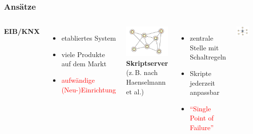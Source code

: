 \documentclass{beamer}
\newcommand{\customitemsep}{7pt}
\begin{document}
\begin{frame}
	\frametitle{Ansätze}
    \begin{columns}[c]
        \column[c]{10cm}
            \textbf{EIB/KNX}
            \begin{itemize} \setlength{\itemsep}{\customitemsep}
                \item etabliertes System
                \item viele Produkte auf dem Markt
                    \vspace*{0.5cm}
                \item \textcolor{red}{aufwändige (Neu-)Einrichtung}
            \end{itemize}
            \includegraphics[width=.9\linewidth]{img/decentralize-network.pdf}
            \pause
        \column{10cm}
            \textbf{Skriptserver} \\
            {\fontsize{15pt}{18pt} \selectfont (z.\,B. nach Haenselmann et al.)}
            \begin{itemize} \setlength{\itemsep}{\customitemsep}
                \item zentrale Stelle mit Schaltregeln
                \item Skripte jederzeit anpassbar
                    \vspace*{0.5cm}
                \item \textcolor{red}{\enquote{Single Point of Failure}}
            \end{itemize}
            \includegraphics[width=.9\linewidth]{img/centralize-network.pdf}
    \end{columns}
\end{frame}
\end{document}
